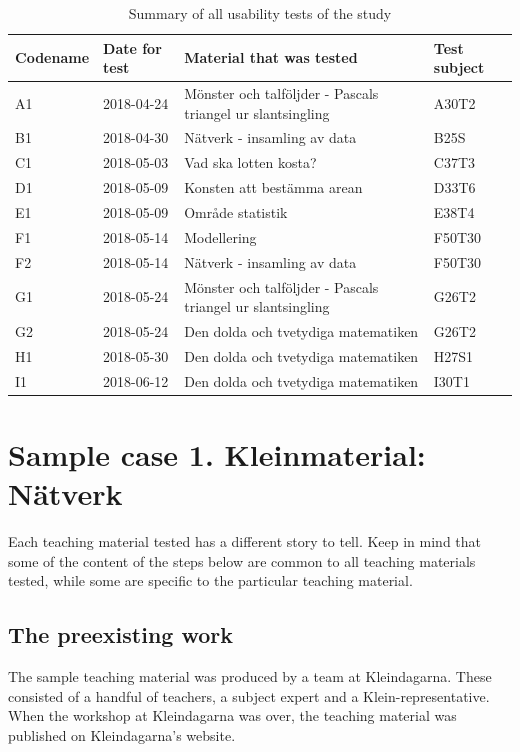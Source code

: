 \begin{table}[H]
\centering
\caption{Summary of all usability tests of the study}
\begin{tabular}{llll} \hline\hline
  Codename & Date for test & Material that was tested & Test subject \\ \hline
  A1 & 2018-04-24 & Mönster och talföljder - Pascals triangel ur slantsingling & A30T2 \\ \hline
  B1 & 2018-04-30 & Nätverk - insamling av data & B25S \\ \hline
  C1 & 2018-05-03 & Vad ska lotten kosta? & C37T3 \\ \hline
  D1 & 2018-05-09 & Konsten att bestämma arean & D33T6 \\ \hline
  E1 & 2018-05-09 & Område statistik & E38T4 \\ \hline
  F1 & 2018-05-14 & Modellering & F50T30 \\ \hline
  F2 & 2018-05-14 & Nätverk - insamling av data & F50T30 \\ \hline
  G1 & 2018-05-24 & Mönster och talföljder - Pascals triangel ur slantsingling & G26T2 \\ \hline
  G2 & 2018-05-24 & Den dolda och tvetydiga matematiken & G26T2 \\ \hline
  H1 & 2018-05-30 & Den dolda och tvetydiga matematiken & H27S1 \\ \hline
  I1 & 2018-06-12 & Den dolda och tvetydiga matematiken & I30T1
  \\ \hline\hline
\end{tabular}
\end{table}

\section{Sample case 1. Kleinmaterial: Nätverk}
Each teaching material tested has a different story to tell. Keep in mind that some of the content of the steps below are common to all teaching materials tested, while some are specific to the particular teaching material.

\subsection{The preexisting work}
The sample teaching material was produced by a team at Kleindagarna. These consisted of a handful of teachers, a subject expert and a Klein-representative. When the workshop at Kleindagarna was over, the teaching material was published on Kleindagarna's website. 

